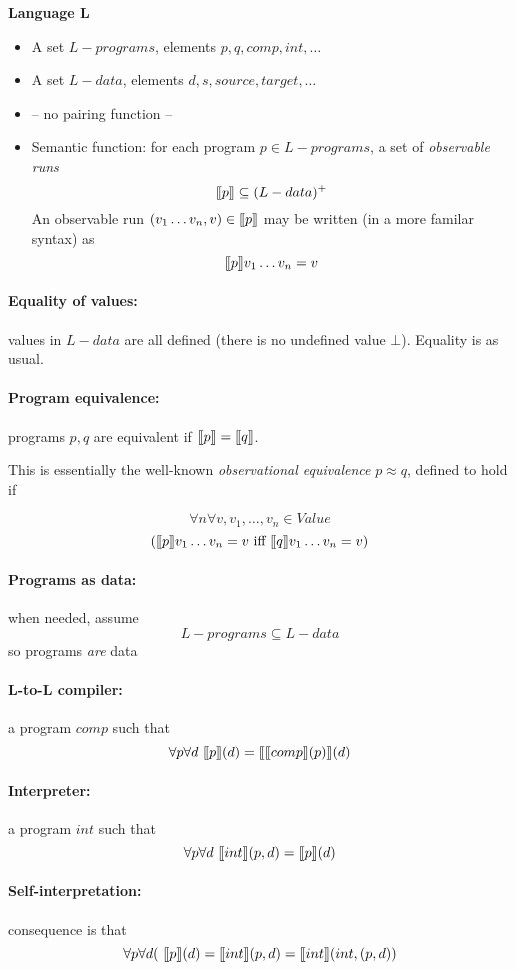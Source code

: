 \documentclass[11pt,fleqn]{article}
\newcommand{\lsem}{\mbox{$\lbrack\hspace{-0.3ex}\lbrack$}}
\newcommand{\rsem}{\mbox{$\rbrack\hspace{-0.3ex}\rbrack$}}
\newcommand{\bc}{\begin{center}}
\newcommand{\ec}{\end{center}}
\newcommand{\bi}{\begin{itemize}}
\newcommand{\ei}{\end{itemize}}
\newcommand{\val}{\mathit{Value}}
\newcommand{\pg}[1]{\paragraph{#1}}
\begin{document}
{\bf Language L} 
\bi
\item A set $L-programs$, elements $p, q, comp, int,\ldots$
\item A set $L-data$, elements $d, s, source, target,\ldots$

\item -- no pairing function --
\item Semantic function: for each program $p \in L-programs$, a set of {\em observable runs}
$$
\lsem p\rsem  \subseteq (L-data)^+
$$
An observable run $(v_1\ldots v_n, v) \in \lsem p\rsem$  may be written (in a more familar syntax)
as
$$\lsem p\rsem v_1\ldots v_n = v
$$

\ei





\pg{Equality of values:} values in $L-data$ are all defined (there is no undefined value $\bot$). Equality is as usual.

\pg{Program equivalence:} programs $p,q$ are equivalent if $\lsem p\rsem = \lsem q\rsem$. 

This is essentially the well-known {\em observational  equivalence} $p \approx q$, defined to hold if 

$$
\forall n\forall v, v_1,\ldots,v_n \in \val$$
$$( 
\lsem p\rsem v_1\ldots v_n = v
\mbox{\ iff\ }
\lsem q\rsem v_1\ldots v_n = v )
$$


\pg{Programs as data:} when needed, assume $$L-programs \subseteq L-data$$
so programs {\em are} data




\newpage




\bc{}
\ec

\pg{L-to-L compiler:} a program $comp$ such that
$$
\forall p\forall d\ \lsem p\rsem(d) = \lsem\lsem comp\rsem(p)\rsem(d)
$$


\pg{Interpreter:} a program $int$ such that
$$
\forall p\forall d\ \lsem int\rsem(p,d) = \lsem p\rsem(d) 
$$

\vspace{15mm}

\pg{Self-interpretation:} consequence is that
$$
\forall p\forall d(\ \lsem p\rsem(d) = \lsem int\rsem(p,d)  = \lsem int\rsem(int,(p,d)) 
$$

\end{document}
